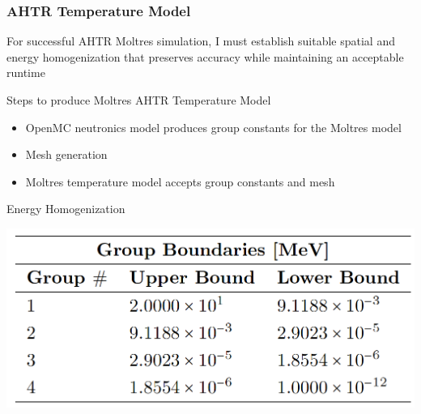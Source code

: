 \begin{frame}
    \frametitle{AHTR Temperature Model}
    For successful AHTR Moltres simulation, I must establish suitable spatial and
    energy homogenization that preserves accuracy while maintaining an acceptable
    runtime
    \begin{block}{Steps to produce Moltres AHTR Temperature Model}
        \begin{itemize}
          \item OpenMC neutronics model produces group constants for the Moltres model
          \item Mesh generation
          \item Moltres temperature model accepts group constants and mesh
        \end{itemize}
    \end{block}
    \begin{block}{Energy Homogenization}
        \begin{table}[]
            \centering
            \begin{minipage}[c]{0.6\textwidth}
                \centering
                \includegraphics[width=0.8\linewidth]{figures/ahtr-energy-discr.png}
            \end{minipage}\hfill
            \begin{minipage}[c]{0.4\textwidth}
            \caption{4-group energy structures for AHTR geometry 
            derived by \cite{gentry_development_2016}.}
        \end{minipage}
        \end{table}
    \end{block}
\end{frame}

